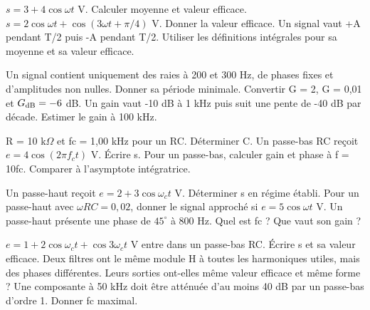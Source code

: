 $s=3+4\cos\omega t$ V. Calculer moyenne et valeur efficace.
$s=2\cos\omega t+\cos(3\omega t+\pi/4)$ V. Donner la valeur efficace.
Un signal vaut +A pendant T/2 puis -A pendant T/2. Utiliser les définitions intégrales pour sa moyenne et sa valeur efficace.


Un signal contient uniquement des raies à 200 et 300 Hz, de phases fixes et d’amplitudes non nulles. Donner sa période minimale.
Convertir G = 2, G = 0,01 et $G_{\rm dB}=-6$ dB.
Un gain vaut -10 dB à 1 kHz puis suit une pente de -40 dB par décade. Estimer le gain à 100 kHz.


R = 10 k$\Omega$ et fc = 1,00 kHz pour un RC. Déterminer C.
Un passe-bas RC reçoit $e=4\cos(2\pi f_ct)$ V. Écrire s.
Pour un passe-bas, calculer gain et phase à f = 10fc. Comparer à l’asymptote intégratrice.


Un passe-haut reçoit $e=2+3\cos\omega_ct$ V. Déterminer s en régime établi.
Pour un passe-haut avec $\omega RC=0{,}02$, donner le signal approché si $e=5\cos\omega t$ V.
Un passe-haut présente une phase de $45^\circ$ à 800 Hz. Quel est fc ? Que vaut son gain ?


$e=1+2\cos\omega_ct+\cos3\omega_ct$ V entre dans un passe-bas RC. Écrire s et sa valeur efficace.
Deux filtres ont le même module H à toutes les harmoniques utiles, mais des phases différentes. Leurs sorties ont-elles même valeur efficace et même forme ?
Une composante à 50 kHz doit être atténuée d’au moins 40 dB par un passe-bas d’ordre 1. Donner fc maximal.


